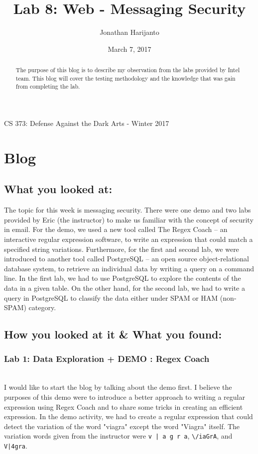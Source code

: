 \documentclass[letterpaper,10pt,titlepage,draftclsnofoot,onecolumn]{IEEEtran}
\title{Lab 8: Web - Messaging Security}
\author{Jonathan Harijanto}
\date{March 7, 2017}
\begin{document}
\maketitle
\begin{center}
CS 373: Defense Against the Dark Arts - Winter 2017
\vfill
\end{center}

\begin{abstract}

The purpose of this blog is to describe my observation from the labs provided by Intel team.
This blog will cover the testing methodology and the knowledge that was gain from completing the lab.

\end{abstract}
\newpage

\section{Blog} 

\subsection{What you looked at:}
The topic for this week is messaging security. 
There were one demo and two labs provided by Eric (the instructor) to make us familiar with the concept of security in email.
For the demo, we used a new tool called The Regex Coach -- an interactive regular expression software, to write an expression that could match a specified string variations.
Furthermore, for the first and second lab, we were introduced to another tool called PostgreSQL -- an open source object-relational database system, to retrieve an individual data by writing a query on a command line. 
In the first lab, we had to use PostgreSQL to explore the contents of the data in a given table. 
On the other hand, for the second lab, we had to write a query in PostgreSQL to classify the data either under SPAM or HAM (non-SPAM) category.

\subsection{How you looked at it \& What you found:}
\subsubsection{Lab 1: Data Exploration + DEMO : Regex Coach}
\hfill\\	
I would like to start the blog by talking about the demo first.
I believe the purposes of this demo were to introduce a better approach to writing a regular expression using Regex Coach and to share some tricks in creating an efficient expression.
In the demo activity, we had to create a regular expression that could detect the variation of the word "viagra" except the word "Viagra" itself. The variation words given from the instructor were \verb=v | a g r a=, \verb=\/iaGrA=, and \verb=V|4gra=.
\end{document}
